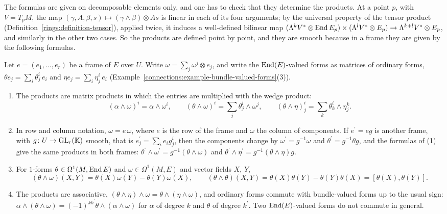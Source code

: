 The formulas are given on decomposable elements only, and one has to check that they determine the products. At a point $p$, with $V = T_pM$, the map
$(\gamma, A, \beta, s) \mapsto (\gamma \wedge \beta) \otimes As$ is linear in each of its four arguments; by the universal property of the tensor product (Definition~\ref{rings:definition-tensor}), applied twice,
it induces a well-defined bilinear map $(\Lambda^kV^* \otimes \operatorname{End} E_p) \times (\Lambda^lV^* \otimes E_p) \to \Lambda^{k+l}V^* \otimes E_p$, and similarly in the other two cases. So the products are defined
point by point, and they are smooth because in a frame they are given by the following formulas.

\begin{proposition}\label{connections:proposition-products}
Let $e = (e_1, \ldots, e_r)$ be a frame of $E$ over $U$. Write $\omega = \sum_j\omega^j \otimes e_j$, and write the $\operatorname{End}(E)$-valued forms as matrices of ordinary forms, $\theta e_j = \sum_i\theta^i_j\,e_i$
and $\eta e_j = \sum_i\eta^i_j\,e_i$ (Example~\ref{connections:example-bundle-valued-forms}(3)).
\begin{enumerate}
\item The products are matrix products in which the entries are multiplied with the wedge product:
\[
(\alpha \wedge \omega)^i = \alpha \wedge \omega^i, \qquad (\theta \wedge \omega)^i = \sum_j\theta^i_j \wedge \omega^j, \qquad (\theta \wedge \eta)^i_j = \sum_k\theta^i_k \wedge \eta^k_j .
\]
\item In row and column notation, $\omega = e\,\omega$, where $e$ is the row of the frame and $\omega$ the column of components. If $e^{\prime} = eg$ is another frame, with $g \colon U \to \mathrm{GL}_r(\mathbb{K})$
smooth, that is $e^{\prime}_j = \sum_ie_ig^i_j$, then the components change by $\omega^{\prime} = g^{-1}\omega$ and $\theta^{\prime} = g^{-1}\theta g$, and the formulas of (1) give the same products in
both frames: $\theta^{\prime} \wedge \omega^{\prime} = g^{-1}(\theta \wedge \omega)$ and $\theta^{\prime} \wedge \eta^{\prime} = g^{-1}(\theta \wedge \eta)g$.
\item For $1$-forms $\theta \in \Omega^1(M, \operatorname{End} E)$ and $\omega \in \Omega^1(M, E)$ and vector fields $X$, $Y$,
\[
(\theta \wedge \omega)(X, Y) = \theta(X)\omega(Y) - \theta(Y)\omega(X), \qquad (\theta \wedge \theta)(X, Y) = \theta(X)\theta(Y) - \theta(Y)\theta(X) = [\theta(X), \theta(Y)] .
\]
\item The products are associative, $(\theta \wedge \eta) \wedge \omega = \theta \wedge (\eta \wedge \omega)$, and ordinary forms commute with bundle-valued forms up to the usual sign:
$\alpha \wedge (\theta \wedge \omega) = (-1)^{kk^{\prime}}\theta \wedge (\alpha \wedge \omega)$ for $\alpha$ of degree $k$ and $\theta$ of degree $k^{\prime}$. Two $\operatorname{End}(E)$-valued forms do not commute in general.
\end{enumerate}
\end{proposition}

